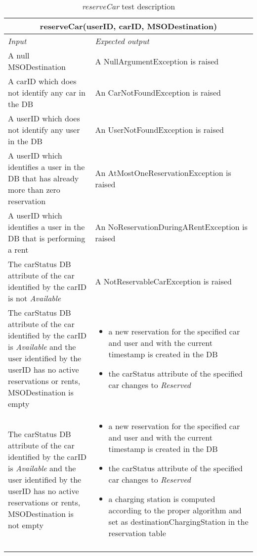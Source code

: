 \clearpage

\begin{longtable}{p{0.35\linewidth}p{0.65\linewidth}}
\multicolumn{2}{c}{\textbf{reserveCar(userID, carID, MSODestination)}} \\
\toprule
\emph{Input} & \emph{Expected output} \\
\midrule
A null MSODestination & A NullArgumentException is raised\\
\midrule
A carID which does not identify any car in the DB & An CarNotFoundException is raised\\
\midrule
A userID which does not identify any user in the DB & An UserNotFoundException is raised\\
\midrule
A userID which identifies a user in the DB that has already more than zero reservation & An AtMostOneReservationException is raised \\
\midrule
A userID which identifies a user in the DB that is performing a rent & An NoReservationDuringARentException is raised \\
\midrule
The carStatus DB attribute of the car identified by the carID is not \emph{Available} & A NotReservableCarException is raised \\
\midrule
The carStatus DB attribute of the car identified by the carID is \emph{Available} and the user identified by the userID has no active reservations or rents, MSODestination is empty & 
\begin{itemize}
	\item a new reservation for the specified car and user and with the current timestamp is created in the DB
	\item the carStatus attribute of the specified car changes to \emph{Reserved}
\end{itemize} \\
\midrule
The carStatus DB attribute of the car identified by the carID is \emph{Available} and the user identified by the userID has no active reservations or rents, MSODestination is not empty & 
\begin{itemize}
	\item a new reservation for the specified car and user and with the current timestamp is created in the DB
	\item the carStatus attribute of the specified car changes to \emph{Reserved}
	\item a charging station is computed according to the proper algorithm and set as destinationChargingStation in the reservation table
\end{itemize}\\
\bottomrule
\caption{\emph{reserveCar} test description}
\end{longtable}


